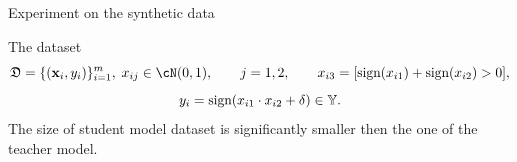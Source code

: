 \documentclass[12pt, aspectratio=169]{beamer}
\begin{document}
\begin{frame}{Experiment on the synthetic data}

\begin{block}{The dataset}
\fontsize{11}{5}\selectfont
$$\fD = \{(\bx_i, y_i)\}_{i=1}^{m},\; x_{ij} \in \cN(0, 1),\qquad j=1, 2, \qquad x_{i3} = [\text{sign}(x_{i1})+\text{sign}(x_{i2})>0],$$
$$y_i = \text{sign}(x_{i1} \cdot x_{i2}+\delta) \in \mathbb{Y}.$$
The size of student model dataset is significantly smaller then the one of the teacher model.
\vspace{-0.2 cm}
\end{block}
\begin{figure}
    \fontsize{5}{5}\selectfont
    \begin{minipage}[h]{0.3\linewidth}
    \end{minipage}
    \begin{minipage}[h]{0.3\linewidth}

\end{minipage}
\end{figure}
\end{frame}
\end{document}
